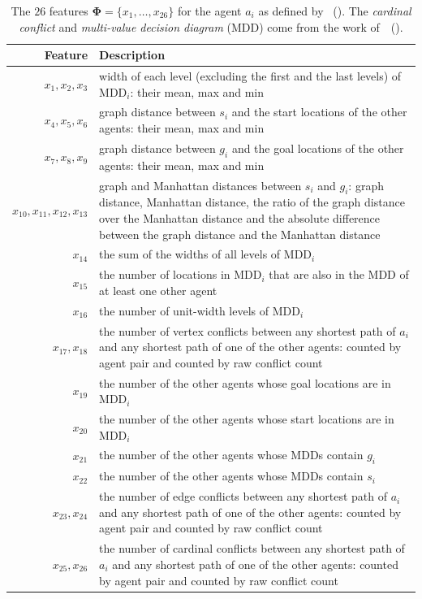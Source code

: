 \documentclass[letterpaper]{article}
\newcommand{\citea}[1]{\citeauthor{#1}~(\citeyear{#1})}
\begin{document}
\begin{table}[t]
\centering
\small
\caption{The $ 26 $ features $ \mathbf{\Phi} = \{x_1,\dots,x_{26}\} $ for the agent $ a_i $ as defined by \citea{zhang2022learning}. The \textit{cardinal conflict} and \textit{multi-value decision diagram} (MDD) come from the work of~\citea{sharon2013increasing}.}
\label{table:features}
\begin{tabular}{r|p{\dimexpr 0.8\linewidth}}
\toprule
\textbf{Feature} & \textbf{Description} \\ \midrule
$x_1, x_2, x_3$ & width of each level (excluding the first and the last levels) of $\text{MDD}_i $: their mean, max and min \\ \midrule
$x_4, x_5, x_6$ & graph distance between $ s_i $ and the start locations of the other agents: their mean, max and min \\ \midrule
$x_7, x_8, x_9$ & graph distance between $ g_i $ and the goal locations of the other agents: their mean, max and min \\ \midrule
$x_{10}, x_{11}, x_{12}, x_{13}$ & graph and Manhattan distances between $ s_i $ and $ g_i $: graph distance, Manhattan distance, the ratio of the graph distance over the Manhattan distance and the absolute difference between the graph distance and the Manhattan distance \\ \midrule
$x_{14}$ & the sum of the widths of all levels of $ \text{MDD}_i $ \\ \midrule
$x_{15}$ & the number of locations in $\text{MDD}_i$ that are also in the MDD of at least one other agent \\ \midrule
$x_{16}$ & the number of unit-width levels of $ \text{MDD}_i $ \\ \midrule
$x_{17}, x_{18}$ & the number of vertex conflicts between any shortest path of $a_i$ and any shortest path of one of the other agents: counted by agent pair and counted by raw conflict count \\ \midrule
$x_{19}$ & the number of the other agents whose goal locations are in $\text{MDD}_i$ \\ \midrule
$x_{20}$ & the number of the other agents whose start locations are in $ \text{MDD}_i $ \\ \midrule
$x_{21}$ & the number of the other agents whose MDDs contain $ g_i $ \\ \midrule
$x_{22}$ & the number of the other agents whose MDDs contain $ s_i $ \\ \midrule
$x_{23}, x_{24}$ & the number of edge conflicts between any shortest path of $a_i$ and any shortest path of one of the other agents: counted by agent pair and counted by raw conflict count \\ \midrule
$x_{25}, x_{26}$ & the number of cardinal conflicts between any shortest path of $a_i$ and any shortest path of one of the other agents: counted by agent pair and counted by raw conflict count \\
\bottomrule
\end{tabular}
\end{table}
\end{document}

